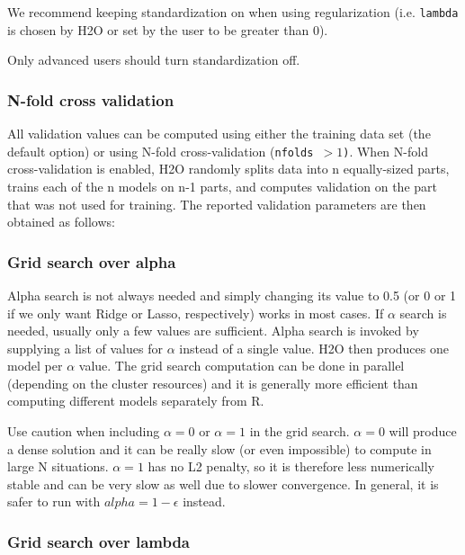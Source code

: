 We recommend keeping standardization on when using regularization (i.e. \texttt{lambda} is chosen by H2O or set by
the user to be greater than 0).

Only advanced users should turn standardization off.

\subsubsection{N-fold cross validation}

All validation values can be computed using either the training data set (the default option) or using N-fold
cross-validation (\texttt{nfolds $> 1$)}. When N-fold cross-validation is enabled, H2O randomly splits data into n
equally-sized parts, trains each of the n models on n-1 parts, and computes validation on the part that was not
used for training. The reported validation parameters are then obtained as follows:

\subsubsection{Grid search over alpha}

Alpha search is not always needed and simply changing its value to 0.5 (or 0 or 1 if we only want Ridge or Lasso,
respectively) works in most cases. If $\alpha$ search is needed, usually only a few values are sufficient. Alpha
search is invoked by supplying a list of values for $\alpha$ instead of a single value. H2O then produces one model
per $\alpha$ value. The grid search computation can be done in parallel (depending on the cluster resources) and it
is generally more efficient than computing different models separately from R.

Use caution when including $\alpha=0$ or $\alpha=1$ in the grid search. $\alpha=0$ will produce a dense solution
and it can be really slow (or even impossible) to compute in large N situations. $\alpha=1$ has no L2 penalty, so
it is therefore less numerically stable and can be very slow as well due to slower convergence. In general, it is
safer to run with $alpha=1-\epsilon$ instead.

\bigskip
\waterExampleInR


\subsubsection{Grid search over lambda}

